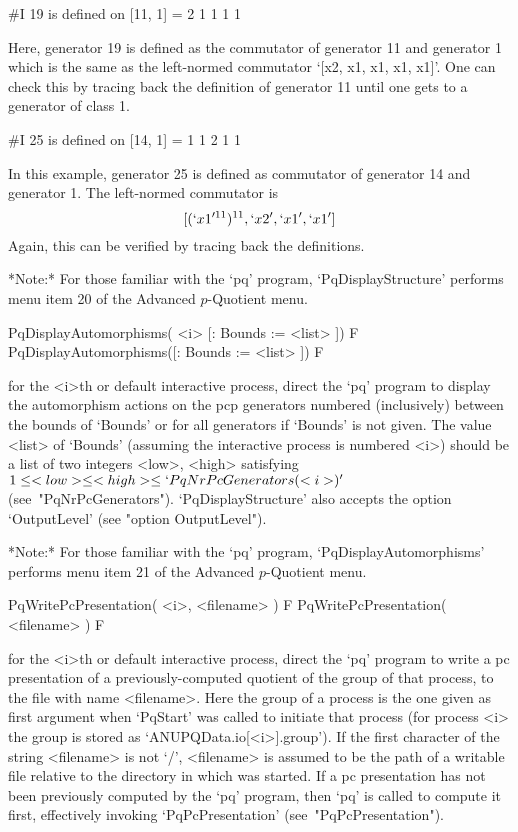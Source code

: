 \begintt
#I  19 is defined on [11, 1] = 2 1 1 1 1    
\endtt
        
Here, generator 19 is defined as  the  commutator  of  generator  11  and
generator  1  which  is  the   same   as   the   left-normed   commutator
`[x2, x1, x1, x1, x1]'. One can check this by tracing back the definition
of generator 11 until one gets to a generator of class 1.

\begintt
#I  25 is defined on [14, 1] = 1 1 2 1 1 
\endtt

In this example, generator 25 is defined as commutator  of  generator  14
and generator 1. The left-normed commutator is
$$
[(`x1'^{11})^{11}, `x2', `x1', `x1']
$$
Again, this can be verified by tracing back the definitions.

\endlist

*Note:*
For those familiar with the `pq'  program,  `PqDisplayStructure'  performs
menu item 20 of the Advanced $p$-Quotient menu.

\>PqDisplayAutomorphisms( <i> [: Bounds := <list> ]) F
\>PqDisplayAutomorphisms([: Bounds := <list> ]) F

for the <i>th or default interactive {\ANUPQ} process,  direct  the  `pq'
program to display the automorphism actions on the pcp generators numbered
(inclusively) between the bounds of `Bounds' or  for  all  generators  if
`Bounds' is not  given.  The  value  <list>  of  `Bounds'  (assuming  the
interactive process is numbered <i>) should be a  list  of  two  integers
<low>,   <high>   satisfying   $1    \le    <low>    \le    <high>    \le
`PqNrPcGenerators(<i>)'$  (see~"PqNrPcGenerators").  `PqDisplayStructure'
also accepts the option `OutputLevel' (see "option OutputLevel").

*Note:*
For  those  familiar  with  the  `pq'  program,   `PqDisplayAutomorphisms'
performs menu item 21 of the Advanced $p$-Quotient menu.

\>PqWritePcPresentation( <i>, <filename> ) F
\>PqWritePcPresentation( <filename> ) F

for the <i>th or default interactive {\ANUPQ} process,  direct  the  `pq'
program to write a pc presentation of a previously-computed  quotient  of
the group of that process, to the file with  name  <filename>.  Here  the
group of a process is the one given as first argument when `PqStart'  was
called to initiate that process (for process <i> the group is  stored  as
`ANUPQData.io[<i>].group').  If  the  first  character  of   the   string
<filename> is not `/', <filename> is assumed to be the path of a writable
file relative to the directory in which  {\GAP}  was  started.  If  a  pc
presentation has not been previously computed by the `pq'  program,  then
`pq'   is   called   to   compute   it   first,   effectively    invoking
`PqPcPresentation' (see~"PqPcPresentation").

